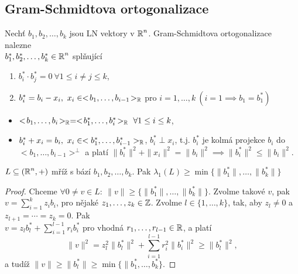 \subsection{Gram-Schmidtova ortogonalizace}
Nechť $b_1,b_2,\ldots,b_k$ jsou LN vektory v $\operatorname{\mathbb{R}}^n$. Gram-Schmidtova ortogonalizace nalezne\\ $b_1^*,b_2^*,\ldots,b_k^*\in \operatorname{\mathbb{R}}^n$ splňující
\begin{enumerate}
    \item $b_i^*\cdot b_j^*=0\ \forall 1\leq i \neq j \leq k$,
    \item $b_i^*=b_i -x_i,\ x_i\in<\!b_1,\ldots,b_{i-1}\!>_{\Real}$ pro $i=1,\ldots,k\ (i=1\implies b_1=b_1^*)$
\end{enumerate}

\begin{note}
\phantom{}
\begin{itemize}
    \item $<\!b_1,\ldots,b_i\!>_{\Real}=<\!b_1^*,\ldots,b_i^*\!>_{\Real}\ \forall 1\leq i\leq k$,
    \item $b_i^*+x_i=b_i, \ x_i\in <b_1^*,\ldots,b_{i-1}^*>_{\operatorname{\mathbb{R}}}$, $b_i^* \perp x_i$, t.j. $b_i^*$ je kolmá projekce $b_i$ do $<\!b_1,\ldots,b_{i-1}\!>^{\perp}$ a platí $\|b_i^*\|^2+\|x_i\|^2=\|b_i\|^2\implies\|b_i^*\|^2\leq \|b_i\|^2.$
\end{itemize}
\end{note}
\pagebreak

\begin{lemma}
$L\subseteq (\operatorname{\mathbb{R}}^n,+)$ mříž s bází $b_1,b_2,\ldots,b_k$. Pak $\lambda_1(L)\geq \min \{\|b_1^*\|,\ldots,\|b_k^*\|\}$
\end{lemma}
\begin{proof}
Chceme $\forall 0\neq v\in L: \ \|v\|\geq \{\|b_1^*\|,\ldots,\|b_k^*\|\}$. Zvolme takové $v$, pak
$v=\sum_{i=1}^k z_ib_i$, pro nějaké $z_1,\ldots,z_k\in\operatorname{\mathbb{Z}}$. Zvolme $l\in\{1,\ldots,k\}$, tak, aby $z_l\neq 0$ a $z_{l+1}=\cdots=z_k=0$. Pak\\
$v=z_lb_l^*+\sum_{i=1}^{l-1}r_ib_i^*$ pro vhodná $r_1,\ldots,r_{l-1}\in\operatorname{\mathbb{R}}$, a platí $$\|v\|^2 = z_l^2\|b_l^*\|^2 + \sum_{i=1}^{l-1}r_i^2\|b_i^*\|^2 \geq \|b_l^*\|^2,$$ a tudíž $\|v\| \geq \|b_l^*\| \geq \min\{\|b_1^*,\dots,b_k^*\}$.
\end{proof}

